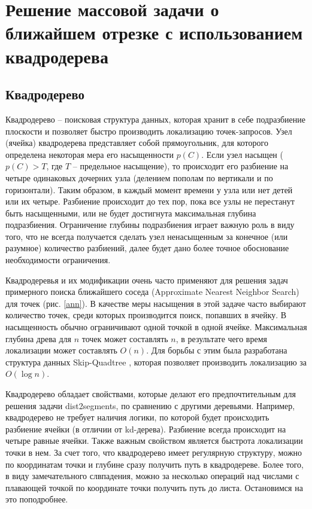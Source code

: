 \chapter{Решение массовой задачи о ближайшем отрезке с использованием квадродерева}
\section{Квадродерево}
Квадродерево -- поисковая структура данных, которая хранит в себе
подразбиение плоскости и позволяет быстро производить локализацию
точек-запросов. Узел (ячейка) квадродерева представляет собой прямоугольник, для
которого определена некоторая мера его насыщенности $p(C)$. Если узел
насыщен ($p(C) > T$, где $T$ -- предельное насыщение), то происходит его
разбиение на четыре одинаковых дочерних узла (делением пополам по
вертикали и по горизонтали). Таким образом, в каждый момент времени у узла
или нет детей или их четыре. Разбиение происходит до тех пор, пока все узлы
не перестанут быть насыщенными, или не будет достигнута максимальная
глубина подразбиения. Ограничение глубины подразбиения играет важную
роль в виду того, что не всегда получается сделать узел ненасыщенным за
конечное (или разумное) количество разбиений, далее будет дано более 
точное обоснование необходимости ограничения.

Квадродеревья и их модификации очень часто применяют для решения
задач примерного поиска ближайшего соседа (Approximate Nearest Neighbor
Search) для точек \cite{FANN} (рис. \ref{ann}). В качестве меры насыщения в этой задаче часто
выбирают количество точек, среди которых производится поиск, попавших в
ячейку. В насыщенность обычно ограничивают одной точкой в одной ячейке.
Максимальная глубина древа для $n$ точек может составлять $n$, в результате чего
время локализации может составлять $O(n)$. Для борьбы с этим была разработана
структура данных Skip-Quadtree \cite{SQT}, которая позволяет производить локализацию за $O(\log n)$.

Квадродерево обладает свойствами, которые делают его предпочтительным
для решения задачи dist2segments, по сравнению с другими деревьями.
Например, квадродерево не требует наличия логики, по которой будет происходить
разбиение ячейки (в отличии от kd-дерева). Разбиение всегда происходит на четыре
равные ячейки. Также важным свойством является быстрота локализации точки в нем.
За счет того, что квадродерево имеет регулярную структуру, можно по координатам точки
и глубине сразу получить путь в квадродереве. Более того, в виду замечательного
слвпадения, можно за несколько операций над числами с плавающей точкой по координате точки получить путь
до листа. Остановимся на это поподробнее.

